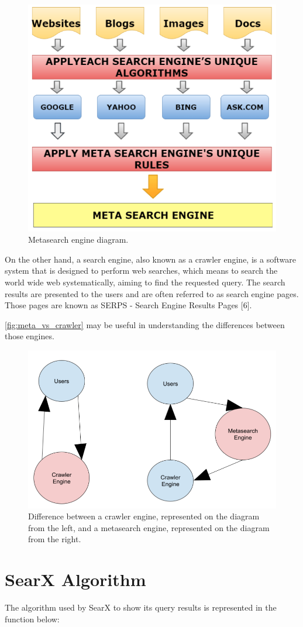 \documentclass{article}
\begin{document}
\begin{figure}[ht]
    \centering
    \includegraphics[width=0.5\linewidth]{metasearch}
    \caption{Metasearch engine diagram.}
    \label{fig:metasearch}
\end{figure}

On the other hand, a search engine, also known as a crawler engine, is a software system that is designed to perform web searches, which means to search the world wide web systematically, aiming to find the requested query. The search results are presented to the users and are often referred to as search engine pages. Those pages are known as SERPS - Search Engine Results Pages [6].

\autoref{fig:meta_vs_crawler} may be useful in understanding the differences between those engines.

\newpage

\begin{figure}[h]
    \centering
    \includegraphics[width=0.7\linewidth]{meta_vs_crawler}
    \caption{Difference between a crawler engine, represented on the diagram from the left, and a metasearch engine, represented on the diagram from the right.}
    \label{fig:meta_vs_crawler}
\end{figure}


\section{SearX Algorithm}
The algorithm used by SearX to show its query results is represented in the function below:
\end{document}
